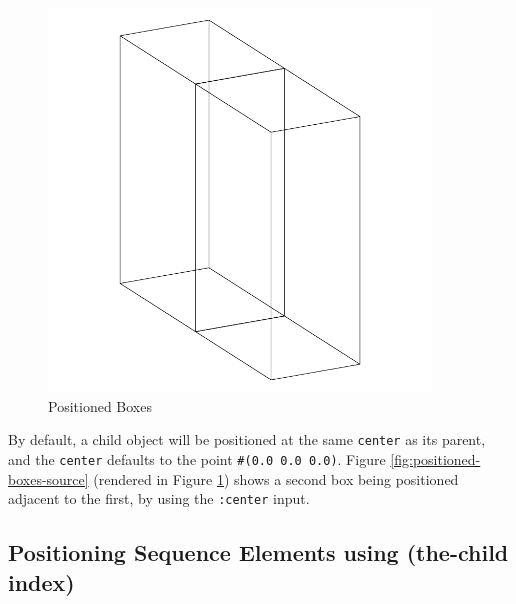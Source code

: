 \documentclass [11pt]{book}
\begin{document}
\begin{figure}
\begin{center}
\includegraphics[width=4in,height=4in]{../images/positioned-boxes.pdf}
\end{center}

\caption{Positioned Boxes}

\label{fig:positioned-boxes}

\end{figure}


By default, a child object will be positioned at the same \texttt{center} as its parent, and the \texttt{center} defaults to the point \texttt{\#(0.0 0.0 0.0)}. Figure 
\ref{fig:positioned-boxes-source} (rendered in Figure 
\ref{fig:positioned-boxes}) shows a second box being positioned adjacent to the first, by using the \texttt{:center} input. 



\subsection{Positioning Sequence Elements using (the-child index)}

\label{subsec:positioningsequenceelementsusing(the-childindex)}
\end{document}
